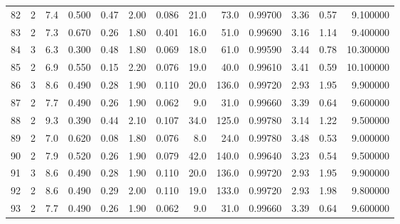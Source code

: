 \begin{tabular}{lrrrrrrrrrrrr}
82   &        2 &            7.4 &             0.500 &         0.47 &            2.00 &      0.086 &                 21.0 &                  73.0 &  0.99700 &  3.36 &       0.57 &   9.100000 \\
83   &        2 &            7.3 &             0.670 &         0.26 &            1.80 &      0.401 &                 16.0 &                  51.0 &  0.99690 &  3.16 &       1.14 &   9.400000 \\
84   &        3 &            6.3 &             0.300 &         0.48 &            1.80 &      0.069 &                 18.0 &                  61.0 &  0.99590 &  3.44 &       0.78 &  10.300000 \\
85   &        2 &            6.9 &             0.550 &         0.15 &            2.20 &      0.076 &                 19.0 &                  40.0 &  0.99610 &  3.41 &       0.59 &  10.100000 \\
86   &        3 &            8.6 &             0.490 &         0.28 &            1.90 &      0.110 &                 20.0 &                 136.0 &  0.99720 &  2.93 &       1.95 &   9.900000 \\
87   &        2 &            7.7 &             0.490 &         0.26 &            1.90 &      0.062 &                  9.0 &                  31.0 &  0.99660 &  3.39 &       0.64 &   9.600000 \\
88   &        2 &            9.3 &             0.390 &         0.44 &            2.10 &      0.107 &                 34.0 &                 125.0 &  0.99780 &  3.14 &       1.22 &   9.500000 \\
89   &        2 &            7.0 &             0.620 &         0.08 &            1.80 &      0.076 &                  8.0 &                  24.0 &  0.99780 &  3.48 &       0.53 &   9.000000 \\
90   &        2 &            7.9 &             0.520 &         0.26 &            1.90 &      0.079 &                 42.0 &                 140.0 &  0.99640 &  3.23 &       0.54 &   9.500000 \\
91   &        3 &            8.6 &             0.490 &         0.28 &            1.90 &      0.110 &                 20.0 &                 136.0 &  0.99720 &  2.93 &       1.95 &   9.900000 \\
92   &        2 &            8.6 &             0.490 &         0.29 &            2.00 &      0.110 &                 19.0 &                 133.0 &  0.99720 &  2.93 &       1.98 &   9.800000 \\
93   &        2 &            7.7 &             0.490 &         0.26 &            1.90 &      0.062 &                  9.0 &                  31.0 &  0.99660 &  3.39 &       0.64 &   9.600000 \\

\end{tabular}
